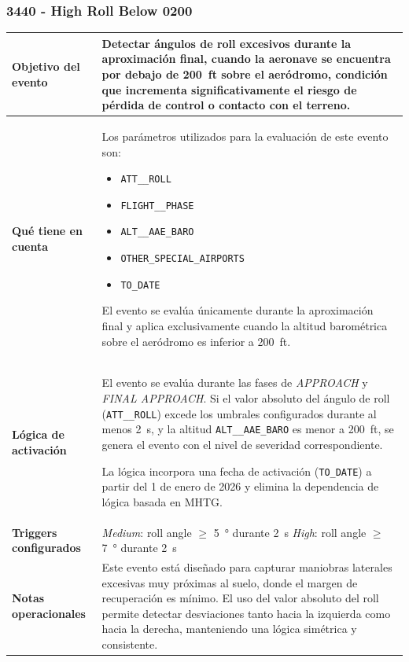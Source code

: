 \documentclass[11pt,a4paper]{article}
\begin{document}
	\subsubsection{3440 - High Roll Below 0200}
	
	\renewcommand{\arraystretch}{1.3}
	\begin{longtable}{p{5cm} p{9.5cm}}
		\hline
		\textbf{Objetivo del evento} &
		Detectar ángulos de roll excesivos durante la aproximación final, cuando la aeronave se encuentra por debajo de \SI{200}{ft} sobre el aeródromo, condición que incrementa significativamente el riesgo de pérdida de control o contacto con el terreno. \\
		\hline
		\textbf{Qué tiene en cuenta} &
		Los parámetros utilizados para la evaluación de este evento son:
		\begin{itemize}
			\item \texttt{ATT\_\_ROLL}
			\item \texttt{FLIGHT\_\_PHASE}
			\item \texttt{ALT\_\_AAE\_BARO}
			\item \texttt{OTHER\_SPECIAL\_AIRPORTS}
			\item \texttt{TO\_DATE}
		\end{itemize}
		El evento se evalúa únicamente durante la aproximación final y aplica exclusivamente cuando la altitud barométrica sobre el aeródromo es inferior a \SI{200}{ft}. \\
		\hline
		\textbf{Lógica de activación} &
		El evento se evalúa durante las fases de \textit{APPROACH} y \textit{FINAL APPROACH}.  
		Si el valor absoluto del ángulo de roll (\texttt{ATT\_\_ROLL}) excede los umbrales configurados durante al menos \SI{2}{s}, y la altitud \texttt{ALT\_\_AAE\_BARO} es menor a \SI{200}{ft}, se genera el evento con el nivel de severidad correspondiente.
		
		La lógica incorpora una fecha de activación (\texttt{TO\_DATE}) a partir del 1 de enero de 2026 y elimina la dependencia de lógica basada en MHTG. \\
		\hline
		\textbf{Triggers configurados} &
		\textit{Medium}: roll angle $\geq$ \SI{5}{\degree} durante \SI{2}{s} \newline
		\textit{High}: roll angle $\geq$ \SI{7}{\degree} durante \SI{2}{s} \\
		\hline
		\textbf{Notas operacionales} &
		Este evento está diseñado para capturar maniobras laterales excesivas muy próximas al suelo, donde el margen de recuperación es mínimo.  
		El uso del valor absoluto del roll permite detectar desviaciones tanto hacia la izquierda como hacia la derecha, manteniendo una lógica simétrica y consistente. \\
		\hline
	\end{longtable}
	
\end{document}
